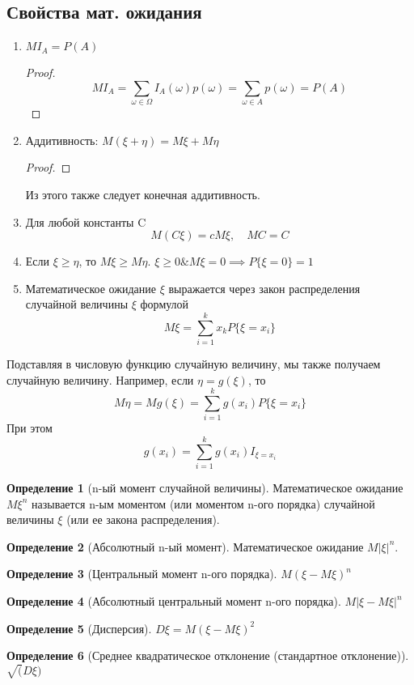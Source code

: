 \documentclass[a4paper]{article}
\theoremstyle{definition}
\newtheorem*{definition}{Определение}
\theoremstyle{remark}
\begin{document}
\subsection{Свойства мат. ожидания}
\begin{enumerate}
    \item $M I_A = P(A)$
    \begin{proof}
    \[M I_A = \sum_{\omega \in \Omega} I_A(\omega) p (\omega) = \sum_{\omega \in A} p(\omega)  = P(A)\]
    \end{proof}
    \item Аддитивность: $M(\xi + \eta) = M\xi + M\eta$
    \begin{proof}
        
    \end{proof}
    Из этого также следует конечная аддитивность.
    \item Для любой константы C \[M(C\xi) = cM\xi,\quad MC = C\]
    \item Если $\xi \ge \eta$, то $M \xi \ge M \eta$.
    $\xi \ge 0 \& M\xi = 0\implies P\{\xi = 0\} = 1$
    \item Математическое ожидание $\xi$ выражается через закон распределения случайной величины $\xi$ формулой
    \[M\xi = \sum_{i = 1}^k x_k P \{\xi = x_i\}\]

\end{enumerate}
Подставляя в числовую функцию случайную величину, мы также получаем случайную величину. Например, если $\eta = g(\xi)$, то \[M\eta  = M g(\xi)  = \sum_{i = 1}^k g(x_i) P\{\xi = x_i\}\]
При этом \[g(x_i) = \sum_{i = 1}^k g(x_i) I_{\xi = x_i}\]
\begin{definition}[n-ый момент случайной величины]
    Математическое ожидание $M\xi^n$ называется n-ым моментом (или моментом n-ого порядка) случайной величины $\xi$ (или ее закона распределения).
\end{definition}
\begin{definition}[Абсолютный n-ый момент]
    Математическое ожидание $M {|\xi|}^n$.
\end{definition}
\begin{definition}[Центральный момент n-ого порядка]
    $M(\xi-M\xi)^n$
\end{definition}
\begin{definition}[Абсолютный центральный момент n-ого порядка]
    $M|\xi-M\xi|^n$
\end{definition}
\begin{definition}[Дисперсия]
    $D\xi = M(\xi - M\xi)^2$
\end{definition}
\begin{definition}[Среднее квадратическое отклонение (стандартное отклонение)]
    $\sqrt(D\xi)$
\end{definition}
\end{document}
